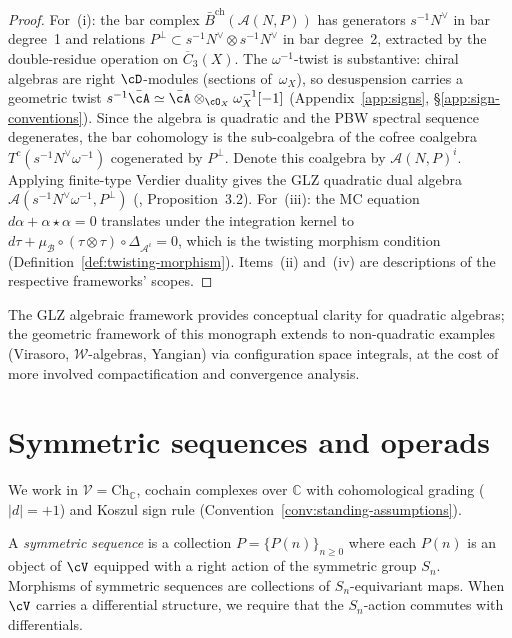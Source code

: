 \begin{proof}
For~(i): the bar complex $\bar{B}^{\mathrm{ch}}(\mathcal{A}(N,P))$
has generators $s^{-1}N^\vee$ in bar degree~1 and relations
$P^\perp \subset s^{-1}N^\vee \otimes s^{-1}N^\vee$ in bar degree~2,
extracted by the double-residue operation on $\overline{C}_3(X)$. The
$\omega^{-1}$-twist is substantive: chiral algebras are
right $\cD$-modules (sections of~$\omega_X$), so
desuspension carries a geometric twist
$s^{-1}\bar{\cA} \simeq \bar{\cA} \otimes_{\cO_X}
\omega_X^{-1}[-1]$
(Appendix~\ref{app:signs}, \S\ref{app:sign-conventions}).
Since the algebra is quadratic and the PBW spectral sequence
degenerates, the bar cohomology is the sub-coalgebra of the
cofree coalgebra $T^c(s^{-1}N^\vee \omega^{-1})$ cogenerated by
$P^\perp$. Denote this coalgebra by $\mathcal A(N,P)^i$.
Applying finite-type Verdier duality gives the GLZ quadratic
dual algebra
$\mathcal{A}(s^{-1}N^\vee\omega^{-1},P^\perp)$
(\cite{GLZ22}, Proposition~3.2). For~(iii): the MC equation
$d\alpha + \alpha \star \alpha = 0$ translates under the integration
kernel to $d\tau + \mu_{\mathcal{B}} \circ (\tau \otimes \tau)
\circ \Delta_{\mathcal{A}^i} = 0$, which is the twisting morphism
condition (Definition~\ref{def:twisting-morphism}). Items~(ii)
and~(iv) are descriptions of the respective frameworks' scopes.
\end{proof}

\begin{remark}
\label{rem:advantages-comparison}
The GLZ algebraic framework provides conceptual clarity for quadratic
algebras; the geometric framework of this monograph extends to
non-quadratic examples (Virasoro, $\mathcal{W}$-algebras, Yangian)
via configuration space integrals, at the cost of more involved
compactification and convergence analysis.
\end{remark}

\section{Symmetric sequences and operads}

We work in $\mathcal{V} = \mathrm{Ch}_\mathbb{C}$, cochain complexes over $\mathbb{C}$ with cohomological grading ($|d| = +1$) and Koszul sign rule (Convention~\ref{conv:standing-assumptions}).

\begin{definition}
A \emph{symmetric sequence} is a collection $P = \{P(n)\}_{n \geq 0}$ where each $P(n)$ is an object of $\cV$ equipped with a right action of the symmetric group $S_n$. Morphisms of symmetric sequences are collections of $S_n$-equivariant maps. When $\cV$ carries a differential structure, we require that the $S_n$-action commutes with differentials.
\end{definition}

